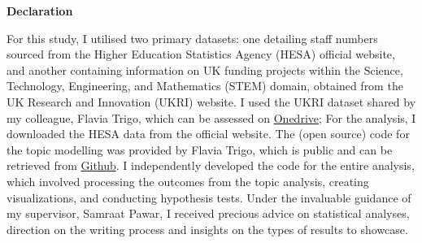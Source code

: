 \begin{center}
    \fontsize{20pt}{25pt}\selectfont
    \textbf{Declaration}
\end{center}
\vspace{1.5cm}

For this study, I utilised two primary datasets: one detailing staff numbers sourced from the Higher Education Statistics Agency (HESA) official website, and another containing information on UK funding projects within the Science, Technology, Engineering, and Mathematics (STEM) domain, obtained from the UK Research and Innovation (UKRI) website. I used the UKRI dataset shared by my colleague, Flavia Trigo, which can be assessed on \href{https://imperiallondon-my.sharepoint.com/personal/fcb5018_ic_ac_uk/_layouts/15/onedrive.aspx?id=\%2Fpersonal\%2Ffcb5018\%5Fic\%5Fac\%5Fuk\%2FDocuments\%2FFunding\%2DLandscape}{Onedrive}; For the analysis, I downloaded the HESA data from the official website. The (open source) code for the topic modelling was provided by Flavia Trigo, which is public and can be retrieved from \href{https://github.com/FCBT/Funding-Landscape}{Github}. I independently developed the code for the entire analysis, which involved processing the outcomes from the topic analysis, creating visualizations, and conducting hypothesis tests. Under the invaluable guidance of my supervisor, Samraat Pawar, I received precious advice on statistical analyses, direction on the writing process and insights on the types of results to showcase.